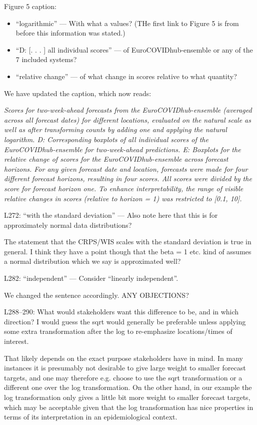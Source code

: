 \documentclass{article}
\newcommand{\red}{\color{red}}
\newcommand{\black}{\color{black}}
\newcommand{\blue}{\color{blue}}
\begin{document}
\blue
Figure 5 caption:
\begin{itemize}
    \item “logarithmic” — With what a values? (THe first link to Figure 5 is from before this information was stated.)
    \item “D: [. . . ] all individual scores” — of EuroCOVIDhub-ensemble or any of the 7 included systems?
    \item “relative change” — of what change in scores relative to what quantity?
\end{itemize}

\black
We have updated the caption, which now reads: 

\textit{Scores for two-week-ahead forecasts from the EuroCOVIDhub-ensemble (averaged across all forecast dates) for different locations, evaluated on the natural scale as well as after transforming counts by adding one and applying the natural logarithm. D: Corresponding boxplots of all individual scores of the EuroCOVIDhub-ensemble for two-week-ahead predictions. E: Boxplots for the relative change of scores for the EuroCOVIDhub-ensemble across forecast horizons. For any given forecast date and location, forecasts were made for four different forecast horizons, resulting in four scores. All scores were divided by the score for forecast horizon one. To enhance interpretability, the range of visible relative changes in scores (relative to horizon = 1) was restricted to [0.1, 10].}

\red

L272: “with the standard deviation” — Also note here that this is for approximately normal data distributions?

\black 
The statement that the CRPS/WIS scales with the standard deviation is true in general. I think they have a point though that the beta = 1 etc. kind of assumes a normal distribution which we say is approximated well? 

\blue
L282: “independent” — Consider “linearly independent”.

\black
We changed the sentence accordingly. ANY OBJECTIONS? 

\black

\red
L288–290: What would stakeholders want this difference to be, and in
which direction? I would guess the sqrt would generally be preferable unless applying some extra transformation after the log to re-emphasize locations/times of interest.

\black
That likely depends on the exact purpose stakeholders have in mind. In many instances it is presumably not desirable to give large weight to smaller forecast targets, and one may therefore e.g. choose to use the sqrt transformation or a different one over the log transformation. On the other hand, in our example the log transformation only gives a little bit more weight to smaller forecast targets, which may be acceptable given that the log transformation has nice properties in terms of its interpretation in an epidemiological context. 
\end{document}
